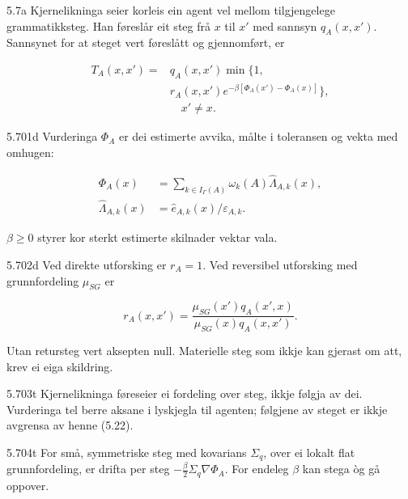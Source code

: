 \begin{formproposition}{5.7}{a}
Kjernelikninga seier korleis ein agent vel mellom tilgjengelege grammatikksteg. Han føreslår eit steg frå \(x\) til \(x'\) med sannsyn \(q_A(x,x')\). Sannsynet for at steget vert føreslått og gjennomført, er

\[
\begin{aligned}
T_A(x,x')={}&q_A(x,x')\min\bigl\{1,\\
& r_A(x,x')e^{-\beta[\Phi_A(x')-\Phi_A(x)]}\bigr\},\\
&\quad x'\ne x .
\end{aligned}
\]
\end{formproposition}

\begin{formproposition}{5.701}{d}
Vurderinga \(\Phi_A\) er dei estimerte avvika, målte i toleransen og vekta med omhugen:

\[
\begin{aligned}
\Phi_A(x)&=\sum_{k\in I_\Gamma(A)}
  \omega_k(A)\hat\Lambda_{A,k}(x),\\
\hat\Lambda_{A,k}(x)&=
  \hat e_{A,k}(x)/\varepsilon_{A,k}.
\end{aligned}
\]

\(\beta\geq0\) styrer kor sterkt estimerte skilnader vektar vala.
\end{formproposition}

\begin{formproposition}{5.702}{d}
Ved direkte utforsking er \(r_A=1\). Ved reversibel utforsking med grunnfordeling \(\mu_{SG}\) er

\[
r_A(x,x')=
\frac{\mu_{SG}(x')q_A(x',x)}
{\mu_{SG}(x)q_A(x,x')}.
\]

Utan retursteg vert aksepten null. Materielle steg som ikkje kan gjerast om att, krev ei eiga skildring.
\end{formproposition}

\begin{formproposition}{5.703}{t}
Kjernelikninga føreseier ei fordeling over steg, ikkje følgja av dei. Vurderinga tel berre aksane i lyskjegla til agenten; følgjene av steget er ikkje avgrensa av henne (5.22).
\end{formproposition}

\begin{formproposition}{5.704}{t}
For små, symmetriske steg med kovarians \(\Sigma_q\), over ei lokalt flat grunnfordeling, er drifta per steg \(-\frac{\beta}{2}\Sigma_q\nabla\Phi_A\). For endeleg \(\beta\) kan stega òg gå oppover.
\end{formproposition}

